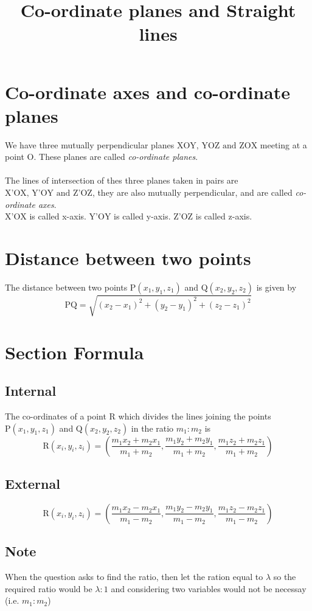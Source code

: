 \documentclass{article}
\title{Co-ordinate planes and Straight lines}
\theoremstyle{definition}
\begin{document}
\maketitle

\section*{Co-ordinate axes and co-ordinate planes}
We have three mutually perpendicular planes $\text{XOY, YOZ and  ZOX}$ meeting at a point $\text{O}$. These planes are called \emph{co-ordinate planes}. \\\\
The lines of intersection of thes three planes taken in pairs are $\text{X'OX, Y'OY and Z'OZ}$, they are also mutually perpendicular, and are called \emph{co-ordinate axes}. \\
$\text{X'OX}$ is called x-axis.
$\text{Y'OY}$ is called y-axis.
$\text{Z'OZ}$ is called z-axis.

\section*{Distance between two points}
The distance between two points $\text{P}(x_{1},y_{1},z_{1})$ and $\text{Q}(x_{2},y_{2},z_{2})$ is given by \[
\text{PQ} = \sqrt{(x_{2}-x_{1})^{2}+(y_{2}-y_{1})^{2} + (z_{2}-z_{1})^{2}}
\] 
\section*{Section Formula}
\subsection{Internal}
The co-ordinates of a point R which divides the lines joining the points $\text{P}(x_{1},y_{1},z_{1})$ and $\text{Q}(x_{2},y_{2},z_{2})$ in the ratio $m_{1}:m_{2}$ is \[
\text{R}(x_{i},y_{i},z_{i}) = \left( \frac{m_{1}x_{2} + m_{2}x_{1}}{m_{1}+m_{2}}, \frac{m_{1}y_{2}+m_{2}y_{1}}{m_{1}+m_{2}}, \frac{m_{1}z_{2}+m_{2}z_{1}}{m_{1}+m_{2}} \right)
\] 

\subsection{External}
\[
\text{R}(x_{i},y_{i},z_{i}) = \left( \frac{m_{1}x_{2} - m_{2}x_{1}}{m_{1}-m_{2}}, \frac{m_{1}y_{2}-m_{2}y_{1}}{m_{1}-m_{2}}, \frac{m_{1}z_{2}-m_{2}z_{1}}{m_{1}-m_{2}} \right)
\]
\setcounter{subsection}{0}
\subsection*{Note}
When the question asks to find the ratio, then let the ration equal to $\lambda$ so the required ratio would be $\lambda:1$ and considering two variables would not be necessay (i.e.  $m_{1}:m_{2}$)
\end{document}
